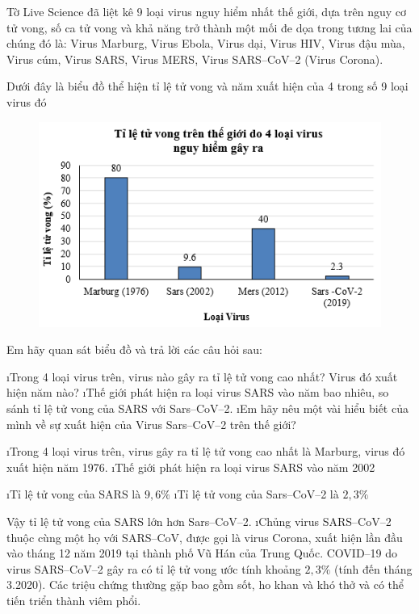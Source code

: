 \begin{bt}
	Tờ Live Science đã liệt kê 9 loại virus nguy hiểm nhất thế giới, dựa trên nguy cơ tử vong, số ca tử vong và khả năng trở thành một mối đe dọa trong tương lai của chúng đó là: Virus Marburg, Virus Ebola, Virus dại, Virus HIV, Virus đậu mùa, Virus cúm, Virus SARS, Virus MERS, Virus SARS--CoV--2 (Virus Corona). 
	
	Dưới đây là biểu đồ thể hiện tỉ lệ tử vong và năm xuất hiện của 4 trong số 9 loại virus đó
	\begin{figure}[H]
		\centering
		\vspace*{-5pt}
		\captionsetup{labelformat= empty, justification=centering}
		\includegraphics[width=0.5\linewidth]{23}
		\vspace*{-10pt}
	\end{figure}
	Em hãy quan sát biểu đồ và trả lời các câu hỏi sau:
	\begin{enumerate}[a),leftmargin=*]
		\i Trong 4 loại virus trên, virus nào gây ra tỉ lệ tử vong cao nhất? Virus đó xuất hiện năm nào?
		\i Thế giới phát hiện ra loại virus SARS vào năm bao nhiêu, so sánh tỉ lệ tử vong của SARS với Sars--CoV--2.
		\i Em hãy nêu một vài hiểu biết của mình về sự xuất hiện của Virus Sars--CoV--2 trên thế giới? 
	\end{enumerate}
	\begin{loigiaichuong42}
		\begin{enumerate}[a),leftmargin=*]
			\i Trong 4 loại virus trên, virus gây ra tỉ lệ tử vong cao nhất là Marburg, virus đó xuất hiện năm 1976.
			\i Thế giới phát hiện ra loại virus SARS vào năm 2002
			\begin{enumerate}[+,leftmargin=*]
				\i Tỉ lệ tử vong của SARS là  $9,6\%$ 
				\i Tỉ lệ tử vong của Sars--CoV--2 là $2,3 \%$ 
			\end{enumerate}
			Vậy tỉ lệ tử vong của SARS lớn hơn Sars--CoV--2.
			\i Chủng virus SARS--CoV--2 thuộc cùng một họ với SARS--CoV, được gọi là virus Corona, xuất hiện lần đầu vào tháng 12 năm 2019 tại thành phố Vũ Hán của Trung Quốc. COVID--19 do virus SARS--CoV--2 gây ra có tỉ lệ tử vong ước tính khoảng $2,3\%$ (tính đến tháng 3.2020). Các triệu chứng thường gặp bao gồm sốt, ho khan và khó thở và có thể tiến triển thành viêm phổi.
		\end{enumerate}
	\end{loigiaichuong42}
\end{bt}
